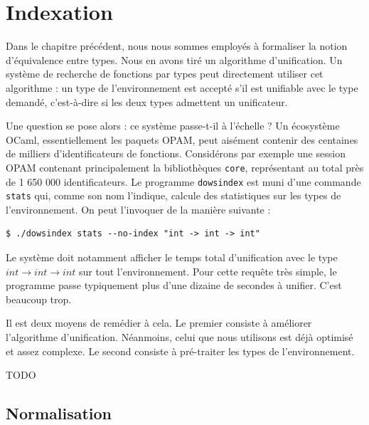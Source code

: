 \documentclass[a4paper]{report}
\theoremstyle{definition}
\newcommand{\dowsindex}{\texttt{dowsindex}\xspace}
\begin{document}

\chapter {Indexation}

Dans le chapitre précédent, nous nous sommes employés à formaliser la notion d'équivalence entre types. Nous en avons tiré un algorithme d'unification. Un système de recherche de fonctions par types peut directement utiliser cet algorithme : un type de l'environnement est accepté s'il est unifiable avec le type demandé, c'est-à-dire si les deux types admettent un unificateur.

Une question se pose alors : ce système passe-t-il à l'échelle ? Un écosystème OCaml, essentiellement les paquets OPAM, peut aisément contenir des centaines de milliers d'identificateurs de fonctions. Considérons par exemple une session OPAM contenant principalement la bibliothèques \texttt{core}, représentant au total près de 1 650 000 identificateurs. Le programme \dowsindex est muni d'une commande \texttt{stats} qui, comme son nom l'indique, calcule des statistiques sur les types de l'environnement. On peut l'invoquer de la manière suivante :

\begin{verbatim}
$ ./dowsindex stats --no-index "int -> int -> int"
\end{verbatim}

Le système doit notamment afficher le temps total d'unification avec le type $int \rightarrow int \rightarrow int$ sur tout l'environnement. Pour cette requête très simple, le programme passe typiquement plus d'une dizaine de secondes à unifier. C'est beaucoup trop.

Il est deux moyens de remédier à cela. Le premier consiste à améliorer l'algorithme d'unification. Néanmoins, celui que nous utilisons est déjà optimisé et assez complexe. Le second consiste à pré-traiter les types de l'environnement.

TODO


\section{Normalisation}
\end{document}
